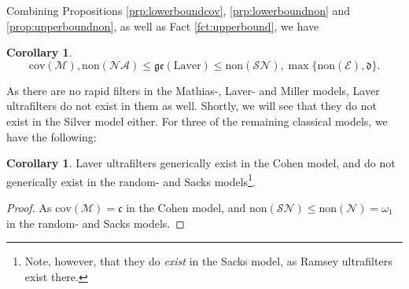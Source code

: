 \documentclass[12pt]{article}
\theoremstyle{definition}
\newtheorem{cor}[nummer]{\sc Corollary}
\begin{document}
Combining Propositions \ref{prp:lowerboundcov}, \ref{prp:lowerboundnon} and \ref{prop:upperboundnon}, as well as Fact \ref{fct:upperbound}, we have

\begin{cor}\label{cor:inequalities}
\[\text{cov}(\mathcal{M}),\text{non}(\mathcal{NA})\leq\mathfrak{ge}(\text{Laver})\leq\text{non}(\mathcal{SN}),\max\{\text{non}(\mathcal{E}), \mathfrak{d}\}.\]
\end{cor}

As there are no rapid filters in the Mathias-, Laver- and Miller models, Laver ultrafilters do not exist in them as well. Shortly, we will see that they do not exist in the Silver model either. For three of the remaining classical models, we have the following:
\begin{cor}
Laver ultrafilters generically exist in the Cohen model, and do not generically exist in the random- and Sacks models\footnote{Note, however, that they do \emph{exist} in the Sacks model, as Ramsey ultrafilters exist there.}.
\end{cor}
\begin{proof}
As $\text{cov}(\mathcal{M})=\mathfrak{c}$ in the Cohen model, and $\text{non}(\mathcal{SN})\leq\text{non}(\mathcal{N})=\omega_1$ in the random- and Sacks models.
\end{proof}
\end{document}
